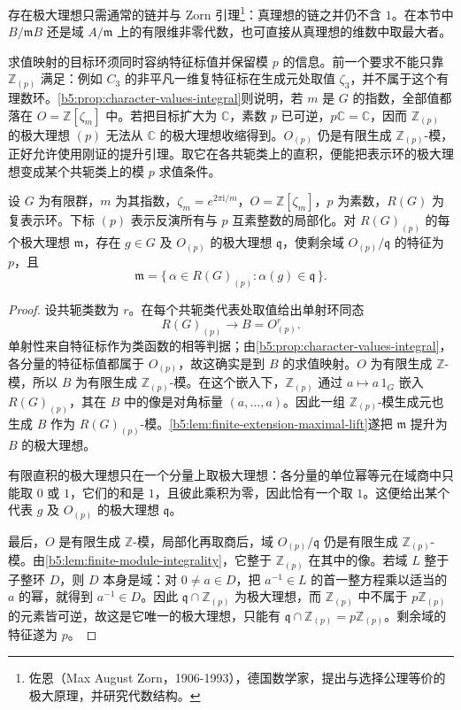 存在极大理想只需通常的链并与 Zorn 引理\footnote{佐恩（Max August Zorn，1906-1993），德国数学家，提出与选择公理等价的极大原理，并研究代数结构。}：真理想的链之并仍不含 \(1\)。在本节中 \(B/\mathfrak mB\) 还是域 \(A/\mathfrak m\) 上的有限维非零代数，也可直接从真理想的维数中取最大者。

\ProseParagraphBreak
求值映射的目标环须同时容纳特征标值并保留模 \(p\) 的信息。前一个要求不能只靠 \(\mathbb Z_{(p)}\) 满足：例如 \(C_3\) 的非平凡一维复特征标在生成元处取值 \(\zeta_3\)，并不属于这个有理数环。\cref{b5:prop:character-values-integral}则说明，若 \(m\) 是 \(G\) 的指数，全部值都落在 \(O=\mathbb Z[\zeta_m]\) 中。若把目标扩大为 \(\mathbb C\)，素数 \(p\) 已可逆，\(p\mathbb C=\mathbb C\)，因而 \(\mathbb Z_{(p)}\) 的极大理想 \((p)\) 无法从 \(\mathbb C\) 的极大理想收缩得到。\(O_{(p)}\) 仍是有限生成 \(\mathbb Z_{(p)}\)-模，正好允许使用刚证的提升引理。取它在各共轭类上的直积，便能把表示环的极大理想变成某个共轭类上的模 \(p\) 求值条件。

\begin{lemma}[极大理想的求值描述]\label{b5:lem:representation-maximal-evaluation}
	设 \(G\) 为有限群，\(m\) 为其指数，\(\zeta_m=e^{2\pi\mathrm i/m}\)，\(O=\mathbb Z[\zeta_m]\)，\(p\) 为素数，\(R(G)\) 为复表示环。下标 \((p)\) 表示反演所有与 \(p\) 互素整数的局部化。对 \(R(G)_{(p)}\) 的每个极大理想 \(\mathfrak m\)，存在 \(g\in G\) 及 \(O_{(p)}\) 的极大理想 \(\mathfrak q\)，使剩余域 \(O_{(p)}/\mathfrak q\) 的特征为 \(p\)，且
	\[
		\mathfrak m=\bigl\{\,\alpha\in R(G)_{(p)}:\alpha(g)\in\mathfrak q\,\bigr\}.
	\]
\end{lemma}
\begin{proof}
	设共轭类数为 \(r\)。在每个共轭类代表处取值给出单射环同态
	\[
		R(G)_{(p)}\longrightarrow B=O_{(p)}^r.
	\]
	单射性来自特征标作为类函数的相等判据；由\cref{b5:prop:character-values-integral}，各分量的特征标值都属于 \(O_{(p)}\)，故这确实是到 \(B\) 的求值映射。\(O\) 为有限生成 \(\mathbb Z\)-模，所以 \(B\) 为有限生成 \(\mathbb Z_{(p)}\)-模。在这个嵌入下，\(\mathbb Z_{(p)}\) 通过 \(a\mapsto a\,1_G\) 嵌入 \(R(G)_{(p)}\)，其在 \(B\) 中的像是对角标量 \((a,\ldots,a)\)。因此一组 \(\mathbb Z_{(p)}\)-模生成元也生成 \(B\) 作为 \(R(G)_{(p)}\)-模。\cref{b5:lem:finite-extension-maximal-lift}遂把 \(\mathfrak m\) 提升为 \(B\) 的极大理想。

	有限直积的极大理想只在一个分量上取极大理想：各分量的单位幂等元在域商中只能取 \(0\) 或 \(1\)，它们的和是 \(1\)，且彼此乘积为零，因此恰有一个取 \(1\)。这便给出某个代表 \(g\) 及 \(O_{(p)}\) 的极大理想 \(\mathfrak q\)。

	最后，\(O\) 是有限生成 \(\mathbb Z\)-模，局部化再取商后，域 \(O_{(p)}/\mathfrak q\) 仍是有限生成 \(\mathbb Z_{(p)}\)-模。由\cref{b5:lem:finite-module-integrality}，它整于 \(\mathbb Z_{(p)}\) 在其中的像。若域 \(L\) 整于子整环 \(D\)，则 \(D\) 本身是域：对 \(0\ne a\in D\)，把 \(a^{-1}\in L\) 的首一整方程乘以适当的 \(a\) 的幂，就得到 \(a^{-1}\in D\)。因此 \(\mathfrak q\cap\mathbb Z_{(p)}\) 为极大理想，而 \(\mathbb Z_{(p)}\) 中不属于 \(p\mathbb Z_{(p)}\) 的元素皆可逆，故这是它唯一的极大理想，只能有 \(\mathfrak q\cap\mathbb Z_{(p)}=p\mathbb Z_{(p)}\)。剩余域的特征遂为 \(p\)。
\end{proof}

